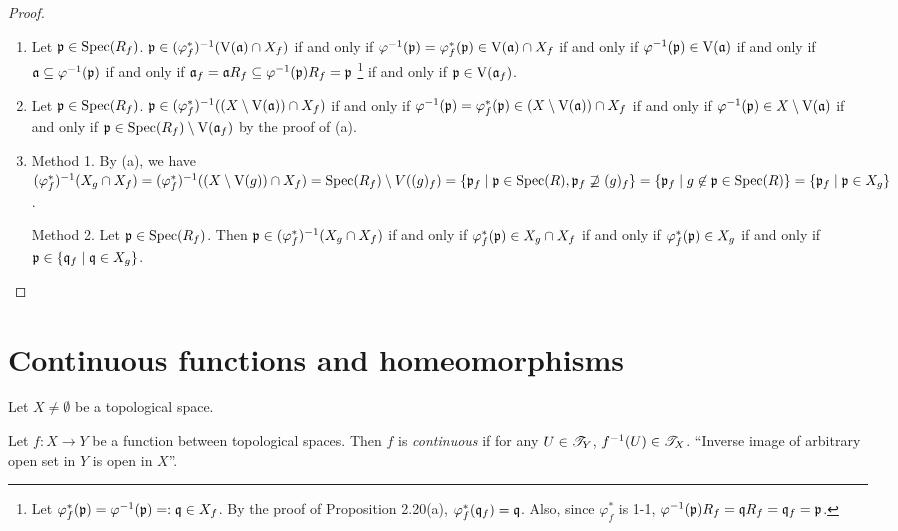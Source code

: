 \begin{proof}
    \begin{enumerate}
        \item Let $\mathfrak{p} \in \operatorname{Spec}(R_f)$. $\mathfrak{p} \in (\varphi_f^*)^{-1}(\operatorname{V}(\mathfrak{a}) \cap X_f)$ if and only if $\varphi^{-1}(\mathfrak{p}) = \varphi_f^*(\mathfrak{p}) \in \operatorname{V}(\mathfrak{a}) \cap X_f$ if and only if $\varphi^{-1}(\mathfrak{p}) \in \operatorname{V}(\mathfrak{a})$ if and only if $\mathfrak{a} \subseteq \varphi^{-1}(\mathfrak{p})$ if and only if $\mathfrak{a}_f = \mathfrak{a} R_f \subseteq \varphi^{-1}(\mathfrak{p})R_f = \mathfrak{p}$ \footnote[2]{Let $\varphi_f^*(\mathfrak{p}) = \varphi^{-1}(\mathfrak{p}) =: \mathfrak{q} \in X_f$. By the proof of Proposition 2.20(a), $\varphi_f^*(\mathfrak{q}_f) = \mathfrak{q}$. Also, since $\varphi_f^*$ is 1-1, $\varphi^{-1}(\mathfrak{p}) R_f = \mathfrak{q} R_f = \mathfrak{q}_f = \mathfrak{p}$.} if and only if $\mathfrak{p} \in \operatorname{V}(\mathfrak{a}_f)$.
        \item Let $\mathfrak{p} \in \operatorname{Spec}(R_f)$. $\mathfrak{p} \in (\varphi_f^*)^{-1}((X \setminus \operatorname{V}(\mathfrak{a})) \cap X_f)$ if and only if $\varphi^{-1}(\mathfrak{p}) = \varphi_f^*(\mathfrak{p}) \in (X \setminus \operatorname{V}(\mathfrak{a})) \cap X_f$ if and only if $\varphi^{-1}(\mathfrak{p}) \in X \setminus \operatorname{V}(\mathfrak{a})$ if and only if $\mathfrak{p} \in \operatorname{Spec}(R_f) \setminus \operatorname{V}(\mathfrak{a}_f)$ by the proof of (a).
        \item Method 1. By (a), we have $(\varphi^*_f)^{-1}(X_g \cap X_f) = (\varphi^*_f)^{-1}((X \setminus \operatorname{V}(g)) \cap X_f) = \operatorname{Spec}(R_f) \setminus V((g)_f) = \{\mathfrak{p}_f \mid \mathfrak{p} \in \operatorname{Spec}(R), \mathfrak{p}_f \not \supseteq (g)_f\} = \{\mathfrak{p}_f \mid g \not \in \mathfrak{p} \in \operatorname{Spec}(R)\} = \{\mathfrak{p}_f \mid \mathfrak{p} \in X_g\}$. \par 
            Method 2. Let $\mathfrak{p} \in \operatorname{Spec}(R_f)$. Then $\mathfrak{p} \in (\varphi_f^*)^{-1}(X_g \cap X_f)$ if and only if $\varphi_f^*(\mathfrak{p}) \in X_g \cap X_f$ if and only if $\varphi_f^*(\mathfrak{p}) \in X_g$ if and only if $\mathfrak{p} \in \{\mathfrak{q}_f \mid \mathfrak{q} \in X_g\}$.
    \end{enumerate}
\end{proof}

\section*{Continuous functions and homeomorphisms}

Let $X \neq \emptyset$ be a topological space. 

\begin{definition}
    Let $f: X \to Y$ be a function between topological spaces. Then $f$ is \emph{continuous} if for any $U \in \mathscr{T}_Y$, $f^{-1}(U) \in \mathscr{T}_X$. ``Inverse image of arbitrary open set in $Y$ is open in $X$''. 
\end{definition}

